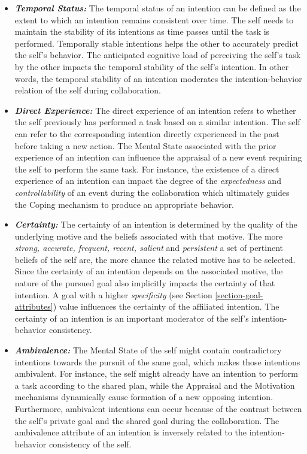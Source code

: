 \documentclass[12pt]{report}
\begin{document}
\begin{itemize}
  \item \textbf{\textit{Temporal Status:}} The temporal status of an intention
  can be defined as the extent to which an intention remains consistent over
  time. The self needs to maintain the stability of its intentions as time
  passes until the task is performed. Temporally stable intentions helps the
  other to accurately predict the self's behavior. The anticipated cognitive
  load of perceiving the self's task by the other impacts the temporal stability
  of the self's intention. In other words, the temporal stability of an
  intention moderates the intention-behavior relation of the self during
  collaboration.
  
  \item \textbf{\textit{Direct Experience:}} The direct experience of an
  intention refers to whether the self previously has performed a task based on
  a similar intention. The self can refer to the corresponding intention
  directly experienced in the past before taking a new action. The Mental State
  associated with the prior experience of an intention can influence the
  appraisal of a new event requiring the self to perform the same task. For
  instance, the existence of a direct experience of an intention can impact the
  degree of the \textit{expectedness} and \textit{controllability} of an event
  during the collaboration which ultimately guides the Coping mechanism to
  produce an appropriate behavior.
  
  \item \textbf{\textit{Certainty:}} The certainty of an intention is determined
  by the quality of the underlying motive and the beliefs associated with that
  motive. The more \textit{strong, accurate, frequent, recent, salient} and
  \textit{persistent} a set of pertinent beliefs of the self are, the more
  chance the related motive has to be selected. Since the certainty of an
  intention depends on the associated motive, the nature of the pursued goal also
  implicitly impacts the certainty of that intention. A goal with a higher
  \textit{specificity} (see Section \ref{section-goal-attributes}) value
  influences the certainty of the affiliated intention. The certainty of an
  intention is an important moderator of the self's intention-behavior
  consistency.
  
  \item \textbf{\textit{Ambivalence:}} The Mental State of the self might
  contain contradictory intentions towards the pursuit of the same goal, which
  makes those intentions ambivalent. For instance, the self might already have
  an intention to perform a task according to the shared plan, while the Appraisal
  and the Motivation mechanisms dynamically cause formation of a new opposing
  intention. Furthermore, ambivalent intentions can occur because of the
  contrast between the self's private goal and the shared goal during the
  collaboration. The ambivalence attribute of an intention is inversely related
  to the intention-behavior consistency of the self.
  

\end{itemize}
\end{document}
